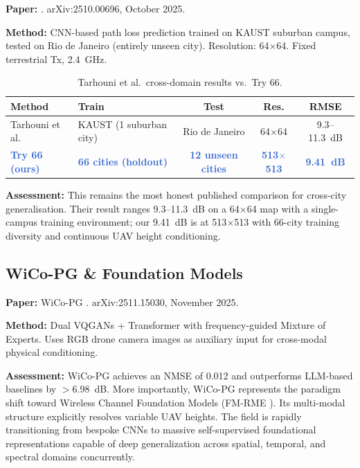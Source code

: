 \documentclass[11pt,a4paper]{article}
\newcommand{\ours}[1]{\textcolor{highlight}{\textbf{#1}}}
\begin{document}
\textbf{Paper:} \cite{tarhouni2025}. arXiv:2510.00696, October 2025.

\textbf{Method:} CNN-based path loss prediction trained on KAUST suburban campus, tested on Rio de Janeiro (entirely unseen city). Resolution: 64$\times$64. Fixed terrestrial Tx, 2.4~GHz.

\begin{table}[h!]
\centering
\caption{Tarhouni et al.\ cross-domain results vs.\ Try 66.}
\label{tab:tarhouni}
\begin{tabularx}{\textwidth}{lXccc}
\toprule
\textbf{Method} & \textbf{Train} & \textbf{Test} & \textbf{Res.} & \textbf{RMSE} \\
\midrule
Tarhouni et al. & KAUST (1 suburban city) & Rio de Janeiro & 64$\times$64 & 9.3--11.3~dB \\
\ours{Try 66 (ours)} & \ours{66 cities (holdout)} & \ours{12 unseen cities} & \ours{513$\times$513} & \ours{9.41~dB} \\
\bottomrule
\end{tabularx}
\end{table}

\textbf{Assessment:} This remains the most honest published comparison for cross-city generalisation. Their result ranges 9.3--11.3~dB on a 64$\times$64 map with a single-campus training environment; our 9.41~dB is at 513$\times$513 with 66-city training diversity and continuous UAV height conditioning.

\subsection{WiCo-PG \& Foundation Models}

\textbf{Paper:} WiCo-PG \cite{wicopg2025}. arXiv:2511.15030, November 2025.

\textbf{Method:} Dual VQGANs + Transformer with frequency-guided Mixture of Experts. Uses RGB drone camera images as auxiliary input for cross-modal physical conditioning.

\textbf{Assessment:} WiCo-PG achieves an NMSE of 0.012 and outperforms LLM-based baselines by $>$6.98~dB. More importantly, WiCo-PG represents the paradigm shift toward Wireless Channel Foundation Models (FM-RME \cite{fmrme2026}). Its multi-modal structure explicitly resolves variable UAV heights. The field is rapidly transitioning from bespoke CNNs to massive self-supervised foundational representations capable of deep generalization across spatial, temporal, and spectral domains concurrently.
\end{document}
